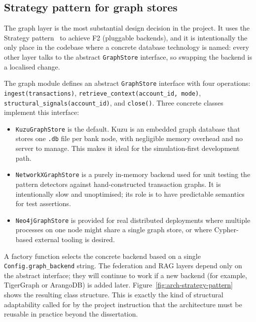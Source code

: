 \documentclass{report}
\begin{document}
\subsection{Strategy pattern for graph stores}
\label{sec:meth:strategy}

The graph layer is the most substantial design decision in the project. It uses the Strategy pattern~\cite{gof1994} to achieve F2 (pluggable backends), and it is intentionally the only place in the codebase where a concrete database technology is named: every other layer talks to the abstract \texttt{GraphStore} interface, so swapping the backend is a localised change.

The graph module defines an abstract \texttt{GraphStore} interface with four operations: \texttt{ingest(transactions)}, \texttt{retrieve\_context(account\_id, mode)}, \texttt{structural\_signals(account\_id)}, and \texttt{close()}. Three concrete classes implement this interface:

\begin{itemize}
    \setlength\itemsep{0em}
    \item \texttt{KuzuGraphStore} is the default. Kuzu is an embedded graph database that stores one \texttt{.db} file per bank node, with negligible memory overhead and no server to manage. This makes it ideal for the simulation-first development path.
    \item \texttt{NetworkXGraphStore} is a purely in-memory backend used for unit testing the pattern detectors against hand-constructed transaction graphs. It is intentionally slow and unoptimised; its role is to have predictable semantics for test assertions.
    \item \texttt{Neo4jGraphStore} is provided for real distributed deployments where multiple processes on one node might share a single graph store, or where Cypher-based external tooling is desired.
\end{itemize}

A factory function selects the concrete backend based on a single \texttt{Config.graph\_backend} string. The federation and RAG layers depend only on the abstract interface; they will continue to work if a new backend (for example, TigerGraph or ArangoDB) is added later. Figure~\ref{fig:arch-strategy-pattern} shows the resulting class structure. This is exactly the kind of structural adaptability called for by the project instruction that the architecture must be reusable in practice beyond the dissertation.
\end{document}
